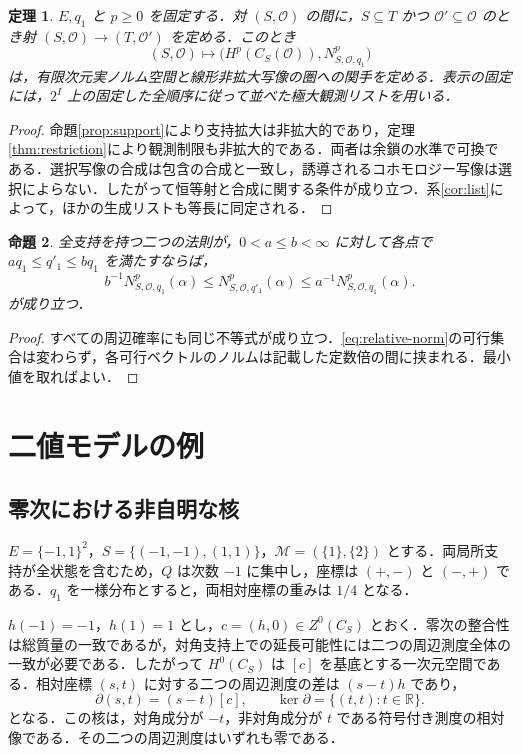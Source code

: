 \documentclass[11pt,a4paper]{article}
\numberwithin{equation}{section}
\theoremstyle{japanese}
\newtheorem{theorem}{定理}[section]
\newtheorem{proposition}[theorem]{命題}
\theoremstyle{remark}
\newcommand{\R}{\mathbb R}
\newcommand{\M}{\mathcal M}
\newcommand{\OO}{\mathcal O}
\begin{document}
\begin{theorem}\label{thm:functor}
$E,q_1$ と $p\ge0$ を固定する．対 $(S,\OO)$ の間に，$S\subseteq T$ かつ $\OO'\subseteq\OO$ のとき射 $(S,\OO)\to(T,\OO')$ を定める．このとき
\[
 (S,\OO)\longmapsto\bigl(H^p(C_S(\OO)),N^p_{S,\OO,q_1}\bigr)
\]
は，有限次元実ノルム空間と線形非拡大写像の圏への関手を定める．表示の固定には，$2^I$ 上の固定した全順序に従って並べた極大観測リストを用いる．
\end{theorem}
\begin{proof}
命題\ref{prop:support}により支持拡大は非拡大的であり，定理\ref{thm:restriction}により観測制限も非拡大的である．両者は余鎖の水準で可換である．選択写像の合成は包含の合成と一致し，誘導されるコホモロジー写像は選択によらない．したがって恒等射と合成に関する条件が成り立つ．系\ref{cor:list}によって，ほかの生成リストも等長に同定される．
\end{proof}

\begin{proposition}\label{prop:reference}
全支持を持つ二つの法則が，$0<a\le b<\infty$ に対して各点で $a q_1\le q'_1\le b q_1$ を満たすならば，
\[
 b^{-1}N^p_{S,\OO,q_1}(\alpha)
 \le N^p_{S,\OO,q'_1}(\alpha)
 \le a^{-1}N^p_{S,\OO,q_1}(\alpha).
\]
が成り立つ．
\end{proposition}
\begin{proof}
すべての周辺確率にも同じ不等式が成り立つ．\eqref{eq:relative-norm}の可行集合は変わらず，各可行ベクトルのノルムは記載した定数倍の間に挟まれる．最小値を取ればよい．
\end{proof}

\section{二値モデルの例}\label{sec:examples}
\subsection{零次における非自明な核}
$E=\{-1,1\}^2$，$S=\{(-1,-1),(1,1)\}$，$\M=(\{1\},\{2\})$ とする．両局所支持が全状態を含むため，$Q$ は次数 $-1$ に集中し，座標は $(+,-)$ と $(-,+)$ である．$q_1$ を一様分布とすると，両相対座標の重みは $1/4$ となる．

$h(-1)=-1$，$h(1)=1$ とし，$c=(h,0)\in Z^0(C_S)$ とおく．零次の整合性は総質量の一致であるが，対角支持上での延長可能性には二つの周辺測度全体の一致が必要である．したがって $H^0(C_S)$ は $[c]$ を基底とする一次元空間である．相対座標 $(s,t)$ に対する二つの周辺測度の差は $(s-t)h$ であり，
\[
 \partial(s,t)=(s-t)[c],\qquad\ker\partial=\{(t,t):t\in\R\}.
\]
となる．この核は，対角成分が $-t$，非対角成分が $t$ である符号付き測度の相対像である．その二つの周辺測度はいずれも零である．
\end{document}
